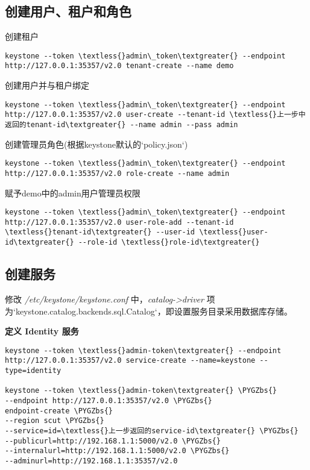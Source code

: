 \documentclass[letterpaper,10pt,english]{sphinxmanual}
\def\PYGZbs{\char`\\}
\begin{document}
\subsection{创建用户、租户和角色}
\label{keystone:id6}
创建租户

\begin{Verbatim}[commandchars=\\\{\}]
keystone --token \textless{}admin\_token\textgreater{} --endpoint http://127.0.0.1:35357/v2.0 tenant-create --name demo
\end{Verbatim}

创建用户并与租户绑定

\begin{Verbatim}[commandchars=\\\{\}]
keystone --token \textless{}admin\_token\textgreater{} --endpoint http://127.0.0.1:35357/v2.0 user-create --tenant-id \textless{}上一步中返回的tenant-id\textgreater{} --name admin --pass admin
\end{Verbatim}

创建管理员角色(根据keystone默认的{}`policy.json{}`)

\begin{Verbatim}[commandchars=\\\{\}]
keystone --token \textless{}admin\_token\textgreater{} --endpoint http://127.0.0.1:35357/v2.0 role-create --name admin
\end{Verbatim}

赋予demo中的admin用户管理员权限

\begin{Verbatim}[commandchars=\\\{\}]
keystone --token \textless{}admin\_token\textgreater{} --endpoint http://127.0.0.1:35357/v2.0 user-role-add --tenant-id \textless{}tenant-id\textgreater{} --user-id \textless{}user-id\textgreater{} --role-id \textless{}role-id\textgreater{}
\end{Verbatim}


\subsection{创建服务}
\label{keystone:id7}
修改 \emph{/etc/keystone/keystone.conf} 中，\emph{catalog-\textgreater{}driver} 项为{}`keystone.catalog.backends.sql.Catalog{}`，即设置服务目录采用数据库存储。

\textbf{定义 Identity 服务}

\begin{Verbatim}[commandchars=\\\{\}]
keystone --token \textless{}admin-token\textgreater{} --endpoint http://127.0.0.1:35357/v2.0 service-create --name=keystone --type=identity

keystone --token \textless{}admin-token\textgreater{} \PYGZbs{}
--endpoint http://127.0.0.1:35357/v2.0 \PYGZbs{}
endpoint-create \PYGZbs{}
--region scut \PYGZbs{}
--service=id=\textless{}上一步返回的service-id\textgreater{} \PYGZbs{}
--publicurl=http://192.168.1.1:5000/v2.0 \PYGZbs{}
--internalurl=http://192.168.1.1:5000/v2.0 \PYGZbs{}
--adminurl=http://192.168.1.1:35357/v2.0
\end{Verbatim}
\end{document}
